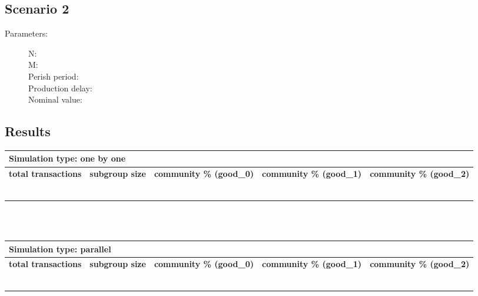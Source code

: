 \documentclass{article}
\begin{document}
\subsection{Scenario 2}
\begin{description}
  \item[Parameters:] \hfill
	\begin{description}
  		\item[N:] 
		\item[M:] 
		\item[Perish period:] 
		\item[Production delay:]
		\item[Nominal value:]
	\end{description}

\end{description}

\subsection{Results}
\begin{tabular}{|  l | c | p{2.5cm} | p{2.5cm} | p{2.5cm} | }
     \multicolumn{5}{l}{\textbf{Simulation type: one by one}} \\ \hline
     \textbf{total transactions} & \textbf{subgroup size} & \textbf{community \% (good\_0)} & \textbf{community \% (good\_1)}  & \textbf{community \% (good\_2)} \\ \hline
     &  & & &  \\ \hline
     &  & & & \\ \hline
     &  & & & \\ \hline
     &  & & &  \\ \hline
     &  & & &  \\ \hline
     &  & & & \\ \hline
\end{tabular}
\\
\\
\begin{tabular}{|  l | c | p{2.5cm} | p{2.5cm} | p{2.5cm} | }
     \multicolumn{5}{l}{\textbf{Simulation type: parallel}} \\ \hline
     \textbf{total transactions} & \textbf{subgroup size} & \textbf{community \% (good\_0)} & \textbf{community \% (good\_1)}  & \textbf{community \% (good\_2)} \\ \hline
     &  & & &  \\ \hline
     &  & & & \\ \hline
     &  & & & \\ \hline
     &  & & &  \\ \hline
     &  & & &  \\ \hline
     &  & & & \\ \hline
\end{tabular}





\end{document}
